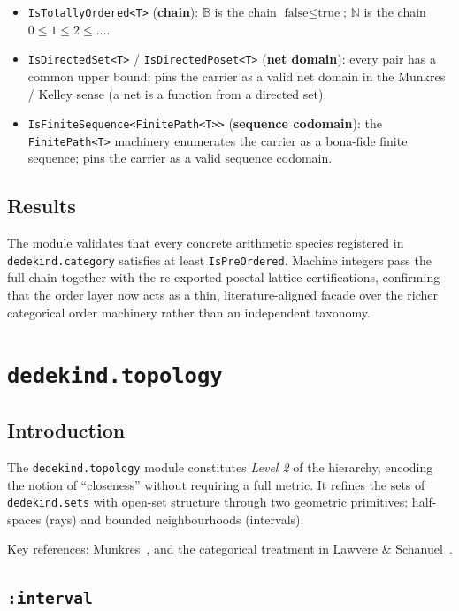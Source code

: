 \documentclass[11pt, a4paper]{report}
\begin{document}
\begin{itemize}
  \item \texttt{IsTotallyOrdered<T>} (\textbf{chain}): $\mathbb{B}$ is the chain $\text{false} \leq \text{true}$; $\mathbb{N}$ is the chain $0 \leq 1 \leq 2 \leq \dots$.
  \item \texttt{IsDirectedSet<T>} / \texttt{IsDirectedPoset<T>} (\textbf{net domain}): every pair has a common upper bound; pins the carrier as a valid net domain in the Munkres / Kelley sense (a net is a function from a directed set).
  \item \texttt{IsFiniteSequence<FinitePath<T>>} (\textbf{sequence codomain}): the \texttt{FinitePath<T>} machinery enumerates the carrier as a bona-fide finite sequence; pins the carrier as a valid sequence codomain.
\end{itemize}

\section{Results}

The module validates that every concrete arithmetic species registered in \texttt{dedekind.category} satisfies at least \texttt{IsPreOrdered}. Machine integers pass the full chain together with the re-exported posetal lattice certifications, confirming that the order layer now acts as a thin, literature-aligned facade over the richer categorical order machinery rather than an independent taxonomy.


\chapter{\texttt{dedekind.topology}}
\label{chap:topology}

\section{Introduction}

The \texttt{dedekind.topology} module constitutes \emph{Level 2} of the hierarchy, encoding the notion of ``closeness'' without requiring a full metric.
It refines the sets of \texttt{dedekind.sets} with open-set structure through two geometric primitives: half-spaces (rays) and bounded neighbourhoods (intervals).

Key references: Munkres~\cite{munkres2000topology}, and the categorical treatment in Lawvere \& Schanuel~\cite{lawvere2003sets}.

\section{\texttt{:interval}}
\label{sec:topology-interval}
\end{document}
